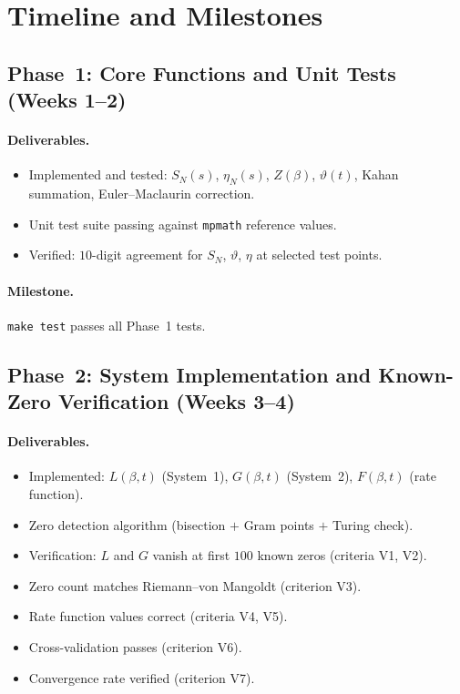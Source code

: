 \section{Timeline and Milestones}
\label{sec:timeline}

\subsection*{Phase~1: Core Functions and Unit Tests (Weeks 1--2)}

\paragraph{Deliverables.}
\begin{itemize}
  \item Implemented and tested: $S_N(s)$, $\eta_N(s)$, $Z(\beta)$, $\vartheta(t)$,
        Kahan summation, Euler--Maclaurin correction.
  \item Unit test suite passing against \texttt{mpmath} reference values.
  \item Verified: $10$-digit agreement for $S_N$, $\vartheta$, $\eta$ at selected test
        points.
\end{itemize}

\paragraph{Milestone.}
\texttt{make test} passes all Phase~1 tests.


\subsection*{Phase~2: System Implementation and Known-Zero Verification (Weeks 3--4)}

\paragraph{Deliverables.}
\begin{itemize}
  \item Implemented: $L(\beta, t)$ (System~1), $G(\beta, t)$ (System~2), $F(\beta, t)$
        (rate function).
  \item Zero detection algorithm (bisection $+$ Gram points $+$ Turing check).
  \item Verification: $L$ and $G$ vanish at first $100$ known zeros (criteria V1, V2).
  \item Zero count matches Riemann--von Mangoldt (criterion V3).
  \item Rate function values correct (criteria V4, V5).
  \item Cross-validation passes (criterion V6).
  \item Convergence rate verified (criterion V7).
\end{itemize}

